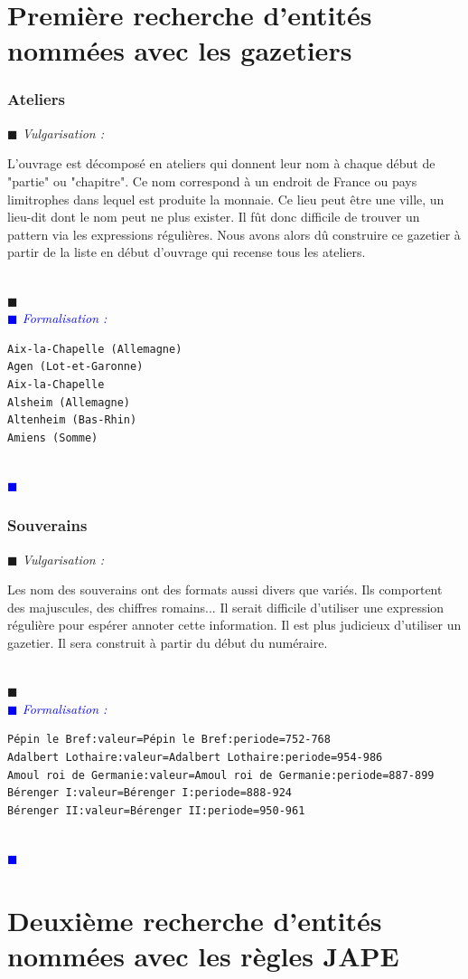 \documentclass[a4paper, 11pt]{report}
\newenvironment{vulgarisation}
    {
    \textit{\textcolor{dark-blue}{$\blacksquare$  Vulgarisation : \\}}

    }
    {
    ~\\\textcolor{dark-blue}{$\blacksquare$}\\
    }
\newenvironment{formalisation}
    {
    \textit{\textcolor{blue}{$\blacksquare$  Formalisation : \\}}
    }
    {
    ~\\\textcolor{blue}{$\blacksquare$}\\
    }
\begin{document}
    
	\section{Première recherche d'entités nommées avec les gazetiers}
	\subsubsection{Ateliers}
\begin{vulgarisation}
	L'ouvrage est décomposé en ateliers qui donnent leur nom à chaque début de "partie" ou "chapitre". Ce nom correspond à un endroit de France ou pays limitrophes dans lequel est produite la monnaie. Ce lieu peut être une ville, un lieu-dit dont le nom peut ne plus exister. Il fût donc difficile de trouver un pattern via les expressions régulières. Nous avons alors dû construire ce gazetier à partir de la liste en début d'ouvrage qui recense tous les ateliers.
\end{vulgarisation}
\begin{formalisation}
\begin{verbatim}
Aix-la-Chapelle (Allemagne)
Agen (Lot-et-Garonne)
Aix-la-Chapelle
Alsheim (Allemagne)
Altenheim (Bas-Rhin)
Amiens (Somme)
\end{verbatim}
\end{formalisation}

\subsubsection{Souverains}
\begin{vulgarisation}
	Les nom des souverains ont des formats aussi divers que variés. Ils comportent des majuscules, des chiffres romains... Il serait difficile d'utiliser une expression régulière pour espérer annoter cette information. Il est plus judicieux d'utiliser un gazetier. Il sera construit à partir du début du numéraire. 
\end{vulgarisation}
\begin{formalisation}
\begin{verbatim}
Pépin le Bref:valeur=Pépin le Bref:periode=752-768
Adalbert Lothaire:valeur=Adalbert Lothaire:periode=954-986
Amoul roi de Germanie:valeur=Amoul roi de Germanie:periode=887-899
Bérenger I:valeur=Bérenger I:periode=888-924
Bérenger II:valeur=Bérenger II:periode=950-961
\end{verbatim}
\end{formalisation}

	\section{Deuxième recherche d'entités nommées avec les règles JAPE}
\end{document}
